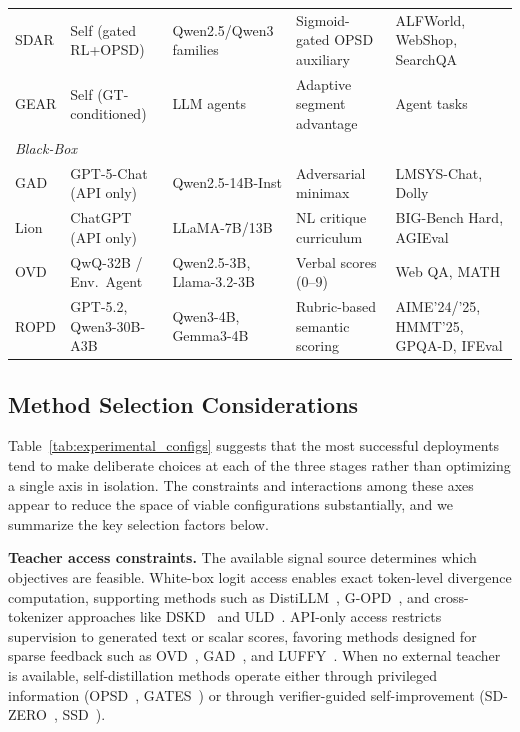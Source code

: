 \documentclass{article} %
\begin{document}
\begin{table}[t]
{\begin{tabular}{@{}lllll@{}}
        SDAR \citep{2605.15155} & Self (gated RL+OPSD) & Qwen2.5/Qwen3 families & Sigmoid-gated OPSD auxiliary & ALFWorld, WebShop, SearchQA \\
        GEAR \citep{2605.11853} & Self (GT-conditioned) & LLM agents & Adaptive segment advantage & Agent tasks \\
        \midrule
        \multicolumn{5}{l}{\textit{Black-Box}} \\
        \midrule
        GAD \citep{2511.10643} & GPT-5-Chat (API only) & Qwen2.5-14B-Inst & Adversarial minimax & LMSYS-Chat, Dolly \\
        Lion \citep{2305.12870} & ChatGPT (API only) & LLaMA-7B/13B & NL critique curriculum & BIG-Bench Hard, AGIEval \\
        OVD \citep{2601.21968} & QwQ-32B / Env.~Agent & Qwen2.5-3B, Llama-3.2-3B & Verbal scores (0--9) & Web QA, MATH \\
        ROPD \citep{2605.07396} & GPT-5.2, Qwen3-30B-A3B & Qwen3-4B, Gemma3-4B & Rubric-based semantic scoring & AIME'24/'25, HMMT'25, GPQA-D, IFEval \\
        \bottomrule
    \end{tabular}
    }
\end{table}


\subsection{Method Selection Considerations}
\label{subsec:decision_tree}

Table~\ref{tab:experimental_configs} suggests that the most successful deployments tend to make deliberate choices at each of the three stages rather than optimizing a single axis in isolation. The constraints and interactions among these axes appear to reduce the space of viable configurations substantially, and we summarize the key selection factors below.

\textbf{Teacher access constraints.} The available signal source determines which objectives are feasible. White-box logit access enables exact token-level divergence computation, supporting methods such as DistiLLM~\citep{2402.03898}, G-OPD~\citep{2602.12125}, and cross-tokenizer approaches like DSKD~\citep{2504.11426} and ULD~\citep{2402.12030}. API-only access restricts supervision to generated text or scalar scores, favoring methods designed for sparse feedback such as OVD~\citep{2601.21968}, GAD~\citep{2511.10643}, and LUFFY~\citep{2504.14945}. When no external teacher is available, self-distillation methods operate either through privileged information (OPSD~\citep{2601.18734}, GATES~\citep{2602.20574}) or through verifier-guided self-improvement (SD-ZERO~\citep{2604.12002}, SSD~\citep{2604.01193}).
\end{document}
